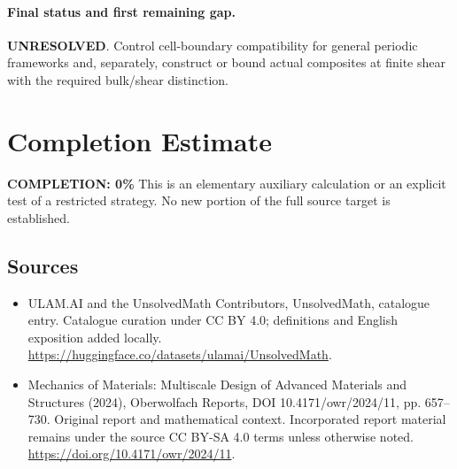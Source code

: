 \documentclass[11pt]{article}
\begin{document}
\paragraph{Final status and first remaining gap.}
\textbf{UNRESOLVED}. Control cell-boundary compatibility for general periodic frameworks and, separately, construct or bound actual composites at finite shear with the required bulk/shear distinction.

\section{Completion Estimate}
\noindent\textbf{COMPLETION: 0\%}
This is an elementary auxiliary calculation or an explicit test of a restricted strategy. No new portion of the full source target is established.

\subsection{Sources}
\begin{itemize}
\item[\hypertarget{source:statement:1}{S1}] ULAM.AI and the UnsolvedMath Contributors, UnsolvedMath, catalogue entry. Catalogue curation under CC BY 4.0; definitions and English exposition added locally.
\url{https://huggingface.co/datasets/ulamai/UnsolvedMath}.
\item[\hypertarget{source:statement:2}{S2}] Mechanics of Materials: Multiscale Design of Advanced Materials and Structures (2024), Oberwolfach Reports, DOI 10.4171/owr/2024/11, pp. 657--730. Original report and mathematical context. Incorporated report material remains under the source CC BY-SA 4.0 terms unless otherwise noted.
\url{https://doi.org/10.4171/owr/2024/11}.
\end{itemize}
\label{end:statement}
\end{document}
